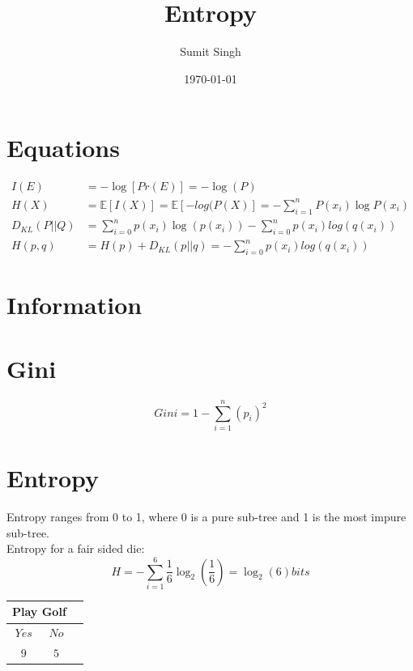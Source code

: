 \documentclass{article}
\title{Entropy}
\author{Sumit Singh}
\date{\today}
\begin{document}
\maketitle

\section{Equations}

\begin{align*}
  I(E) &= - \log[Pr(E)] = - \log(P)  \tag{Information}\\
  H(X) &= \mathbb{E}[I(X)] = \mathbb{E}[-log(P(X)] = - \sum_{i=1}^n P(x_i) \log P(x_i)  \tag{Entropy}\\
  D_{KL}(P||Q) &= \sum_{i=0}^n p(x_i) \log (p(x_i)) - \sum_{i=0}^n p(x_i) log(q(x_i)) \tag{KL Divergence}\\
  H(p,q) &= H(p) + D_{KL}(p||q) = -\sum_{i=0}^n p(x_i) log(q(x_i)) \tag{Cross Entropy}
\end{align*}

\section{Information}
\section{Gini}
\begin{equation*}
    Gini = 1 - \sum_{i=1}^n (p_i)^2
\end{equation*}
\section{Entropy}
Entropy ranges from 0 to 1, where 0 is a pure sub-tree and 1 is the most impure sub-tree. \\
Entropy for a fair sided die:\\
\begin{equation*}
    H = - \sum_{i=1}^6 \frac{1}{6} \log_2 (\frac{1}{6}) = \log_2(6) bits
\end{equation*}
\begin{tabular}{|c|c|c|}
  \hline
  \multicolumn{2}{|c|}{\textbf{Play Golf}}\\
  \hline
   $Yes$       & $No$       \\
  \hline
   $9$       & $5$       \\
  \hline 
\end{tabular}
\end{document}
